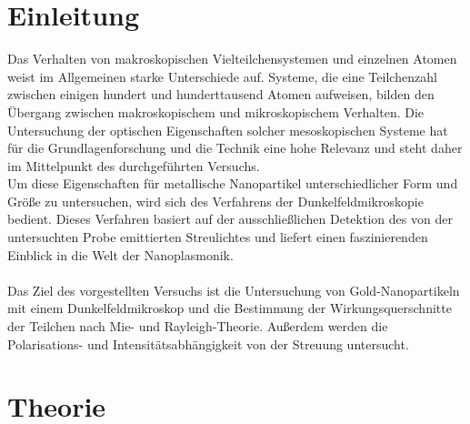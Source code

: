\setcounter{page}{1}
\section*{Einleitung}
Das Verhalten von makroskopischen Vielteilchensystemen und einzelnen Atomen weist im Allgemeinen starke Unterschiede auf. Systeme, die eine Teilchenzahl zwischen einigen hundert und hunderttausend Atomen aufweisen, bilden den Übergang zwischen makroskopischem und mikroskopischem Verhalten. Die Untersuchung der optischen Eigenschaften solcher mesoskopischen Systeme hat für die Grundlagenforschung und die Technik eine hohe Relevanz und steht daher im Mittelpunkt des durchgeführten Versuchs. \cite{anleitung} \cite{bayreuth}\\
Um diese Eigenschaften für metallische Nanopartikel unterschiedlicher Form und Größe zu untersuchen, wird sich des Verfahrens der Dunkelfeldmikroskopie bedient. Dieses Verfahren basiert auf der ausschließlichen Detektion des von der untersuchten Probe emittierten Streulichtes und liefert einen faszinierenden Einblick in die Welt der Nanoplasmonik. \cite{LIU}\\
\\
Das Ziel des vorgestellten Versuchs ist die Untersuchung von Gold-Nanopartikeln mit einem Dunkelfeldmikroskop und die Bestimmung der Wirkungsquerschnitte der Teilchen nach Mie- und Rayleigh-Theorie. Außerdem werden die Polarisations- und Intensitätsabhängigkeit von der Streuung untersucht.\\

\newpage

\section{Theorie}

